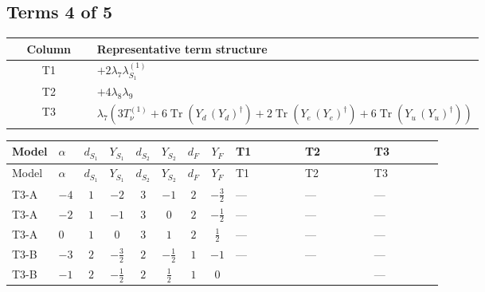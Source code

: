 \documentclass[8pt]{article}
\begin{document}
\begin{landscape}
\subsection*{Terms 4 of 5}
\begin{center}
\begin{tabular}{@{}c >{\raggedright\arraybackslash}p{0.82\linewidth}@{}}
\toprule
Column & Representative term structure \\
\midrule
T1 & \(\displaystyle +2 {\lambda_{7}} {\lambda_{S_1}^{(1)}}\) \\
\midrule
T2 & \(\displaystyle +4 {\lambda_{8}} {\lambda_{9}}\) \\
\midrule
T3 & \(\displaystyle {\lambda_{7}} (3 T_{\nu}^{(1)}+6 \operatorname{Tr}\!\left({Y_d}\,\left({Y_d}\right)^{\dagger}\right)+2 \operatorname{Tr}\!\left({Y_e}\,\left({Y_e}\right)^{\dagger}\right)+6 \operatorname{Tr}\!\left({Y_u}\,\left({Y_u}\right)^{\dagger}\right))\) \\
\midrule
\bottomrule
\end{tabular}
\end{center}
\smallskip
\tiny
\begin{longtable}{@{}llcccccc >{\raggedright\arraybackslash}p{0.21\linewidth} >{\raggedright\arraybackslash}p{0.21\linewidth} >{\raggedright\arraybackslash}p{0.21\linewidth}@{}}
\toprule
Model & $\alpha$ & $d_{S_1}$ & $Y_{S_1}$ & $d_{S_2}$ & $Y_{S_2}$ & $d_F$ & $Y_F$ & T1 & T2 & T3 \\
\midrule
\endfirsthead
\toprule
Model & $\alpha$ & $d_{S_1}$ & $Y_{S_1}$ & $d_{S_2}$ & $Y_{S_2}$ & $d_F$ & $Y_F$ & T1 & T2 & T3 \\
\midrule
\endhead
T3-A & $-4$ & $1$ & $-2$ & $3$ & $-1$ & $2$ & $-\frac{3}{2}$ & --- & --- & --- \\
\midrule
T3-A & $-2$ & $1$ & $-1$ & $3$ & $0$ & $2$ & $-\frac{1}{2}$ & --- & --- & --- \\
\midrule
T3-A & $0$ & $1$ & $0$ & $3$ & $1$ & $2$ & $\frac{1}{2}$ & --- & --- & --- \\
\midrule
T3-B & $-3$ & $2$ & $-\frac{3}{2}$ & $2$ & $-\frac{1}{2}$ & $1$ & $-1$ & --- & --- & --- \\
\midrule
T3-B & $-1$ & $2$ & $-\frac{1}{2}$ & $2$ & $\frac{1}{2}$ & $1$ & $0$ & \scriptsize\adjustbox{max width=\linewidth}{$\begin{gathered} +2 {\lambda_{7}} {\lambda_{S_1}^{(1)}}\end{gathered}$} & \scriptsize\adjustbox{max width=\linewidth}{$\begin{gathered} +4 {\lambda_{8}} {\lambda_{9}}\end{gathered}$} & --- \\

\end{longtable}
\end{landscape}
\end{document}
